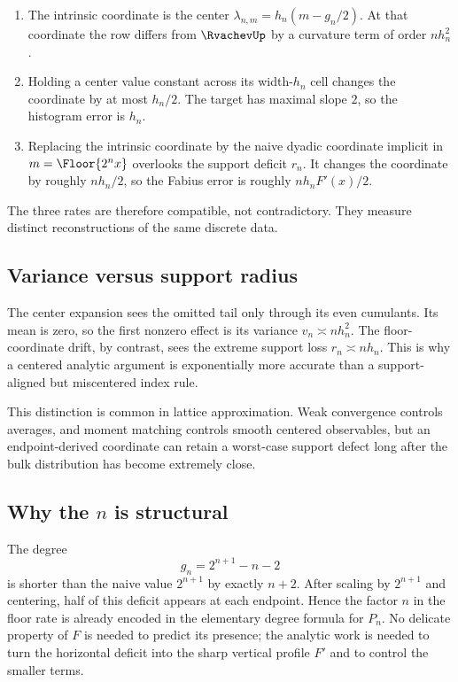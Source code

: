 \documentclass[11pt,oneside]{article}
\theoremstyle{definition}
\theoremstyle{remark}
\begin{document}
\begin{enumerate}
\item The intrinsic coordinate is the center
$\lambda_{n,m}=h_n(m-g_n/2)$.  At that coordinate the row differs from $\RvachevUp$ by a curvature
term of order $nh_n^2$.
\item Holding a center value constant across its width-$h_n$ cell changes the coordinate by
at most $h_n/2$.  The target has maximal slope $2$, so the histogram error is $h_n$.
\item Replacing the intrinsic coordinate by the naive dyadic coordinate implicit in
$m=\Floor{2^nx}$ overlooks the support deficit $r_n$.  It changes the coordinate by
roughly $nh_n/2$, so the Fabius error is roughly $nh_nF'(x)/2$.
\end{enumerate}
The three rates are therefore compatible, not contradictory.  They measure distinct
reconstructions of the same discrete data.

\subsection{Variance versus support radius}

The center expansion sees the omitted tail only through its even cumulants.  Its mean is zero,
so the first nonzero effect is its variance $v_n\asymp nh_n^2$.  The floor-coordinate drift,
by contrast, sees the extreme support loss $r_n\asymp nh_n$.  This is why a centered analytic
argument is exponentially more accurate than a support-aligned but miscentered index rule.

This distinction is common in lattice approximation.  Weak convergence controls averages,
and moment matching controls smooth centered observables, but an endpoint-derived coordinate
can retain a worst-case support defect long after the bulk distribution has become extremely
close.

\subsection{Why the \texorpdfstring{$n$}{n} is structural}

The degree
\begin{equation}
 g_n=2^{n+1}-n-2
\end{equation}
is shorter than the naive value $2^{n+1}$ by exactly $n+2$.  After scaling by
$2^{n+1}$ and centering, half of this deficit appears at each endpoint.  Hence the factor $n$
in the floor rate is already encoded in the elementary degree formula for $P_n$.  No delicate
property of $F$ is needed to predict its presence; the analytic work is needed to turn the
horizontal deficit into the sharp vertical profile $F'$ and to control the smaller terms.
\end{document}
